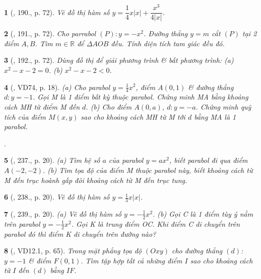 \documentclass{article}
\newtheorem{baitoan}{}
\begin{document}
\begin{baitoan}[\cite{Tuyen_Toan_9_old}, 190., p. 72]
	Vẽ đồ thị hàm số $y = \dfrac{1}{4}x|x| + \dfrac{x^3}{4|x|}$.
\end{baitoan}

\begin{baitoan}[\cite{Tuyen_Toan_9_old}, 191., p. 72]
	Cho parrabol $(P):y = -x^2$. Đường thẳng $y = m$ cắt $(P)$ tại 2 điểm $A,B$. Tìm $m\in\mathbb{R}$ để $\Delta AOB$ đều. Tính diện tích tam giác đều đó.
\end{baitoan}

\begin{baitoan}[\cite{Tuyen_Toan_9_old}, 192., p. 72]
	Dùng đồ thị để giải phương trình \& bất phương trình: (a) $x^2 - x - 2 = 0$. (b) $x^2 - x - 2 < 0$.
\end{baitoan}

\begin{baitoan}[\cite{Binh_Toan_9_tap_2}, VD74, p. 18]
	(a) Cho parabol $y = \frac{1}{4}x^2$, điểm $A(0,1)$ \& đường thẳng $d:y = -1$. Gọi M là 1 điểm bất kỳ thuộc parabol. Chứng minh MA bằng khoảng cách MH từ điểm M đến $d$. (b) Cho điểm $A(0,a)$, $d:y = -a$. Chứng minh quỹ tích của điểm $M(x,y)$ sao cho khoảng cách MH từ M tới $d$ bằng MA là 1 parabol.
\end{baitoan}
\noindent\cite[235., p. 19, 236., p. 20]{Binh_Toan_9_tap_2}.

\begin{baitoan}[\cite{Binh_Toan_9_tap_2}, 237., p. 20]
	(a) Tìm hệ số $a$ của parabol $y = ax^2$, biết parabol đi qua điểm $A(-2,-2)$. (b) Tìm tọa độ của điểm M thuộc parabol này, biết khoảng cách từ M đến trục hoành gấp đôi khoảng cách từ M đến trục tung.
\end{baitoan}

\begin{baitoan}[\cite{Binh_Toan_9_tap_2}, 238., p. 20]
	Vẽ đồ thị hàm số $y = \frac{1}{3}x|x|$.
\end{baitoan}

\begin{baitoan}[\cite{Binh_Toan_9_tap_2}, 239., p. 20]
	(a) Vẽ đồ thị hàm số $y = -\frac{1}{2}x^2$. (b) Gọi C là 1 điểm tùy ý nằm trên parabol $y = -\frac{1}{2}x^2$. Gọi K là trung điểm OC. Khi điểm C di chuyển trên parabol đó thì điểm K di chuyển trên đường nào?
\end{baitoan}

\begin{baitoan}[\cite{TLCT_THCS_Toan_9_dai_so}, VD12.1, p. 65]
	Trong mặt phẳng tọa độ $(Oxy)$ cho đường thẳng $(d)$: $y = -1$ \& điểm $F(0,1)$. Tìm tập hợp tất cả những điểm $I$ sao cho khoảng cách từ $I$ đến $(d)$ bằng $IF$.
\end{baitoan}
\end{document}
